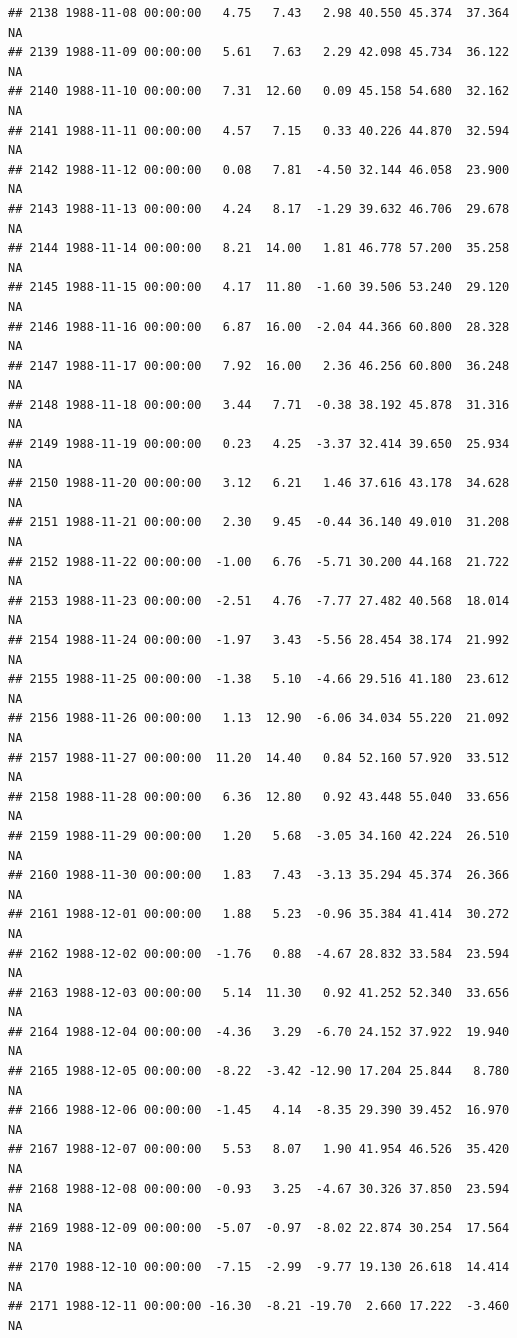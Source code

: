\documentclass{article}\usepackage{graphicx, color}
\makeatletter
\newenvironment{kframe}{%
 \def\at@end@of@kframe{}%
 \ifinner\ifhmode%
  \def\at@end@of@kframe{\end{minipage}}%
  \begin{minipage}{\columnwidth}%
 \fi\fi%
 \def\FrameCommand##1{\hskip\@totalleftmargin \hskip-\fboxsep
 \colorbox{shadecolor}{##1}\hskip-\fboxsep
     \hskip-\linewidth \hskip-\@totalleftmargin \hskip\columnwidth}%
 \MakeFramed {\advance\hsize-\width
   \@totalleftmargin\z@ \linewidth\hsize
   \@setminipage}}%
 {\par\unskip\endMakeFramed%
 \at@end@of@kframe}
\newenvironment{knitrout}{}{} %
\makeatother
\begin{document}
\begin{knitrout}
\begin{kframe}
\begin{verbatim}
## 2138 1988-11-08 00:00:00   4.75   7.43   2.98 40.550 45.374  37.364     NA
## 2139 1988-11-09 00:00:00   5.61   7.63   2.29 42.098 45.734  36.122     NA
## 2140 1988-11-10 00:00:00   7.31  12.60   0.09 45.158 54.680  32.162     NA
## 2141 1988-11-11 00:00:00   4.57   7.15   0.33 40.226 44.870  32.594     NA
## 2142 1988-11-12 00:00:00   0.08   7.81  -4.50 32.144 46.058  23.900     NA
## 2143 1988-11-13 00:00:00   4.24   8.17  -1.29 39.632 46.706  29.678     NA
## 2144 1988-11-14 00:00:00   8.21  14.00   1.81 46.778 57.200  35.258     NA
## 2145 1988-11-15 00:00:00   4.17  11.80  -1.60 39.506 53.240  29.120     NA
## 2146 1988-11-16 00:00:00   6.87  16.00  -2.04 44.366 60.800  28.328     NA
## 2147 1988-11-17 00:00:00   7.92  16.00   2.36 46.256 60.800  36.248     NA
## 2148 1988-11-18 00:00:00   3.44   7.71  -0.38 38.192 45.878  31.316     NA
## 2149 1988-11-19 00:00:00   0.23   4.25  -3.37 32.414 39.650  25.934     NA
## 2150 1988-11-20 00:00:00   3.12   6.21   1.46 37.616 43.178  34.628     NA
## 2151 1988-11-21 00:00:00   2.30   9.45  -0.44 36.140 49.010  31.208     NA
## 2152 1988-11-22 00:00:00  -1.00   6.76  -5.71 30.200 44.168  21.722     NA
## 2153 1988-11-23 00:00:00  -2.51   4.76  -7.77 27.482 40.568  18.014     NA
## 2154 1988-11-24 00:00:00  -1.97   3.43  -5.56 28.454 38.174  21.992     NA
## 2155 1988-11-25 00:00:00  -1.38   5.10  -4.66 29.516 41.180  23.612     NA
## 2156 1988-11-26 00:00:00   1.13  12.90  -6.06 34.034 55.220  21.092     NA
## 2157 1988-11-27 00:00:00  11.20  14.40   0.84 52.160 57.920  33.512     NA
## 2158 1988-11-28 00:00:00   6.36  12.80   0.92 43.448 55.040  33.656     NA
## 2159 1988-11-29 00:00:00   1.20   5.68  -3.05 34.160 42.224  26.510     NA
## 2160 1988-11-30 00:00:00   1.83   7.43  -3.13 35.294 45.374  26.366     NA
## 2161 1988-12-01 00:00:00   1.88   5.23  -0.96 35.384 41.414  30.272     NA
## 2162 1988-12-02 00:00:00  -1.76   0.88  -4.67 28.832 33.584  23.594     NA
## 2163 1988-12-03 00:00:00   5.14  11.30   0.92 41.252 52.340  33.656     NA
## 2164 1988-12-04 00:00:00  -4.36   3.29  -6.70 24.152 37.922  19.940     NA
## 2165 1988-12-05 00:00:00  -8.22  -3.42 -12.90 17.204 25.844   8.780     NA
## 2166 1988-12-06 00:00:00  -1.45   4.14  -8.35 29.390 39.452  16.970     NA
## 2167 1988-12-07 00:00:00   5.53   8.07   1.90 41.954 46.526  35.420     NA
## 2168 1988-12-08 00:00:00  -0.93   3.25  -4.67 30.326 37.850  23.594     NA
## 2169 1988-12-09 00:00:00  -5.07  -0.97  -8.02 22.874 30.254  17.564     NA
## 2170 1988-12-10 00:00:00  -7.15  -2.99  -9.77 19.130 26.618  14.414     NA
## 2171 1988-12-11 00:00:00 -16.30  -8.21 -19.70  2.660 17.222  -3.460     NA

\end{verbatim}
\end{kframe}
\end{knitrout}
\end{document}
